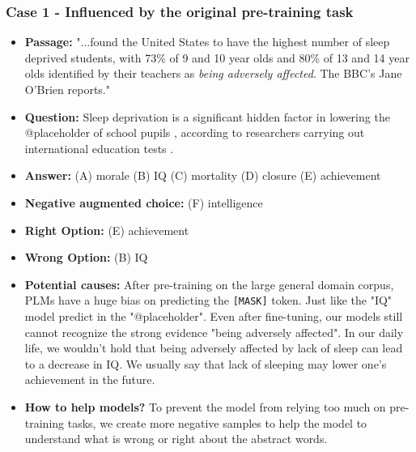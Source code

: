 \documentclass[11pt,a4paper]{article}
\begin{document}
\subsubsection*{Case 1 - Influenced by the original pre-training task}
\begin{itemize}
\setlength{\itemsep}{0pt}
\setlength{\parsep}{0pt}
\setlength{\parskip}{0pt}
    \item \textbf{Passage:} "...found the United States to have the highest number of sleep deprived students, with 73\% of 9 and 10 year olds and 80\% of 13 and 14 year olds identified by their teachers as \textit{being adversely affected}. The BBC's Jane O'Brien reports."
    \item \textbf{Question:} Sleep deprivation is a significant hidden factor in lowering the @placeholder of school pupils , according to researchers carrying out international education tests .
    \item \textbf{Answer:} (A) morale (B) IQ (C) mortality (D) closure (E) achievement
    \item \textbf{Negative augmented choice:} (F) intelligence 
    \item \textbf{Right Option:} (E) achievement
    \item \textbf{Wrong Option:} (B) IQ
    \item \textbf{Potential causes:} After pre-training on the large general domain corpus, PLMs have a huge bias on predicting the \texttt{[MASK]} token. Just like the "IQ" model predict in the "@placeholder". Even after fine-tuning, our models still cannot recognize the strong evidence "being adversely affected". In our daily life, we wouldn't hold that being adversely affected by lack of sleep can lead to a decrease in IQ. We usually say that lack of sleeping may lower one's achievement in the future.
    \item\textbf{How to help models?} To prevent the model from relying too much on pre-training tasks, we create more negative samples to help the model to understand what is wrong or right about the abstract words.
\end{itemize}
\end{document}
